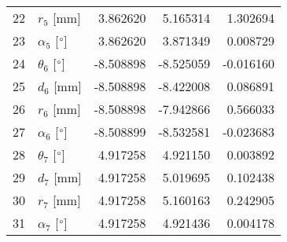 \documentclass{standalone}%
\begin{document}
\begin{tabular}{llrrr}
22 &              $r_{5}$ [mm] &  3.862620 &   5.165314 &   1.302694 \\
23 &  $\alpha_{5}$ [$\degree$] &  3.862620 &   3.871349 &   0.008729 \\
24 &  $\theta_{6}$ [$\degree$] & -8.508898 &  -8.525059 &  -0.016160 \\
25 &              $d_{6}$ [mm] & -8.508898 &  -8.422008 &   0.086891 \\
26 &              $r_{6}$ [mm] & -8.508898 &  -7.942866 &   0.566033 \\
27 &  $\alpha_{6}$ [$\degree$] & -8.508899 &  -8.532581 &  -0.023683 \\
28 &  $\theta_{7}$ [$\degree$] &  4.917258 &   4.921150 &   0.003892 \\
29 &              $d_{7}$ [mm] &  4.917258 &   5.019695 &   0.102438 \\
30 &              $r_{7}$ [mm] &  4.917258 &   5.160163 &   0.242905 \\
31 &  $\alpha_{7}$ [$\degree$] &  4.917258 &   4.921436 &   0.004178 \\
\bottomrule
\end{tabular}
%
\end{document}
